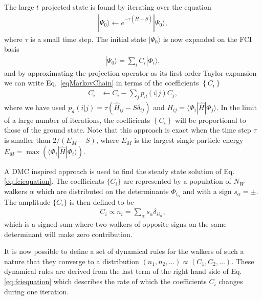\documentclass[aps,twocolumn,showpacs,floatfix,nofootinbib,preprintnumbers,superscriptaddress,amsmath,amssymb]{revtex4-1}
\newcommand{\expec}[1]{\langle #1 \rangle}
\begin{document}
The large $t$ projected state is found by iterating over the equation
\begin{align}
	|\Psi_0\rangle \gets e^{-\tau(\hat H-S)} |\Psi_0\rangle,
	\label{eqMarkovChain}
\end{align}
where $\tau$ is a small time step. %
%
The initial state $|\Psi_0\rangle$ is now expanded on the FCI basis
\begin{align}
	|\Psi_0\rangle = \sum_i C_i |\Phi_i\rangle,
	\label{}
\end{align}
and by approximating the projection operator as its first order Taylor expansion
we can write Eq.~\eqref{eqMarkovChain} in terms of the coefficients $\left\{ C_i \right\}$
\begin{align}
	C_{i} %
	&\gets  C_{i} - \sum_jp_d(i|j) C_{j},
	\label{eq:fciequation}
\end{align}
where we have used $p_d(i|j) = \tau(\hat H_{ij}-S\delta_{ij})$ and
$H_{ij}=\expec{\Phi_i|\hat H|\Phi_j}$.  In the limit of a large number
of iterations, the coefficients $\left\{ C_i \right\}$ will be
proportional to those of the ground state.
%
Note that this approach is exact when the time step $\tau$ is smaller
than $2/(E_M-S)$, where $E_M$ is the largest single particle energy
$E_M=\max(\expec{\Phi_i|\hat H|\Phi_i})$.
	
A DMC inspired approach is used to find the steady state solution of
Eq. \eqref{eq:fciequation}.  The coefficients $\{C_i\}$ are
represented by a population of $N_W$ walkers $\alpha$ which are
distributed on the determinants $\Phi_{i_\alpha}$ and with a sign
$s_\alpha=\pm$. The amplitude $\{C_i\}$ is then defined to be
\begin{align}
	C_i\propto n_i=\sum_\alpha s_\alpha\delta_{ii_\alpha},
\end{align} 
which is a signed sum where two walkers of opposite signs on the same
determinant will make zero contribution.

It is now possible to define a set of dynamical rules for the walkers
of such a nature that they converge to a distribution
$(n_1,n_2,\dots)\propto (C_1,C_2,\dots)$.  These dynamical rules are
derived from the last term of the right hand side of
Eq. \eqref{eq:fciequation} which describes the rate of which the
coefficients $C_i$ changes during one iteration.
\end{document}
